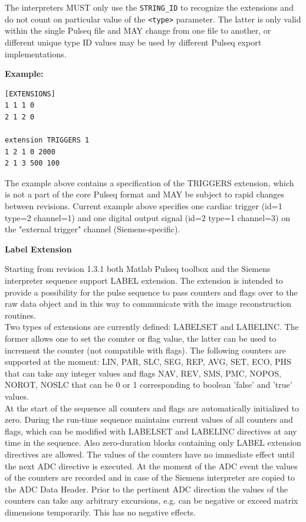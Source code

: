 \documentclass{article}
\begin{document}
The interpreters MUST only use the \verb.STRING_ID. to recognize the extensions and do not count on particular value of the \verb.<type>. parameter. The latter is only valid within the single Pulseq file and MAY change from one file to another, or different unique type ID values may be used by different Pulseq export implementations.

\begin{minipage}{\textwidth}
\textbf{Example:}
\begin{lstlisting}
[EXTENSIONS]
1 1 1 0
2 1 2 0

extension TRIGGERS 1
1 2 1 0 2000
2 1 3 500 100
\end{lstlisting}
\end{minipage}

The example above contains a specification of the TRIGGERS extension, which is not a part of the core Pulseq format and MAY be subject to rapid changes between revisions. Current example above specifies one cardiac trigger (id=1 type=2 channel=1) and one digital output signal (id=2 type=1 channel=3) on the "external trigger" channel (Siemens-specific).

\textbf{Label Extension}

Starting from revision 1.3.1 both Matlab Pulseq toolbox and the Siemens interpreter sequence support LABEL extension. The extension is intended to provide a possibility for the pulse sequence to pass counters and flags over to the raw data object and in this way to communicate with the image reconstruction routines. \\ 

Two types of extensions are currently defined: LABELSET and LABELINC. The former allows one to set the counter or flag value, the latter can be used to increment the counter (not compatible with flags). The following counters are supported at the moment: 
LIN, PAR, SLC, SEG, REP, AVG, SET, ECO, PHS that can take any integer values and flags NAV, REV, SMS, PMC, NOPOS, NOROT, NOSLC that can be 0 or 1 corresponding to boolean 'false' and 'true' values. \\

At the start of the sequence all counters and flags are automatically initialized to zero. During the run-time sequence maintains current values of all counters and flags, which can be modified with LABELSET and LABELINC directives at any time in the sequence. Also zero-duration blocks containing only LABEL extension directives are allowed. The values of the counters have no immediate effect until the next ADC directive is executed. At the moment of the ADC event the values of the counters are recorded and in case of the Siemens interpreter are copied to the ADC Data Header. Prior to the pertinent ADC direction the values of the counters can take any arbitrary excursions, e.g. can be negative or exceed matrix dimensions temporarily. This has no negative effects. \\
\end{document}
